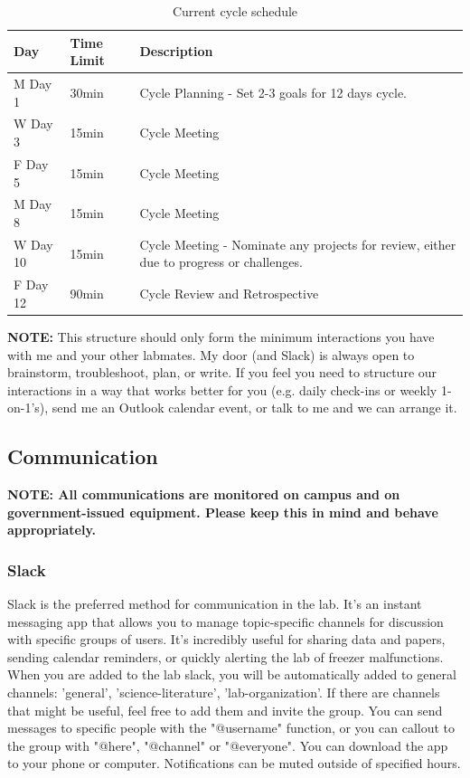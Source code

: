 \documentclass[10pt, letterpaper, twocolumn]{article} %
\begin{document}
\begin{table}
	\caption{Current cycle schedule}
	\centering
	\begin{tabular}{lll}
		\toprule
		\cmidrule(r){1-2}
		Day & Time Limit & Description \\
		\midrule
		M Day 1 & 30min & Cycle Planning - Set 2-3 goals for 12 days cycle. \\
		W Day 3 & 15min & Cycle Meeting  \\
		F Day 5 & 15min & Cycle Meeting \\
		M Day 8 & 15min & Cycle Meeting \\
		W Day 10 & 15min & Cycle Meeting - Nominate any projects for review, either due to progress or challenges.  \\
		F Day 12 & 90min & Cycle Review and Retrospective \\
		\bottomrule
	\end{tabular}
\end{table}

{\bfseries NOTE:} This structure should only form the minimum interactions you have with me and your other labmates. My door (and Slack) is always open to brainstorm, troubleshoot, plan, or write. If you feel you need to structure our interactions in a way that works better for you (e.g. daily check-ins or weekly 1-on-1's), send me an Outlook calendar event, or talk to me and we can arrange it.

\subsection{Communication}
{\bfseries NOTE: All communications are monitored on campus and on government-issued equipment. Please keep this in mind and behave appropriately.}
\subsubsection{Slack}
Slack is the preferred method for communication in the lab. It's an instant messaging app that allows you to manage topic-specific channels for discussion with specific groups of users. It’s incredibly useful for sharing data and papers, sending calendar reminders, or quickly alerting the lab of freezer malfunctions. When you are added to the lab slack, you will be automatically added to general channels: 'general', 'science-literature', 'lab-organization'. If there are channels that might be useful, feel free to add them and invite the group. You can send messages to specific people with the "@username" function, or you can callout to the group with "@here", "@channel" or "@everyone". You can download the app to your phone or computer. Notifications can be muted outside of specified hours.
\end{document}
